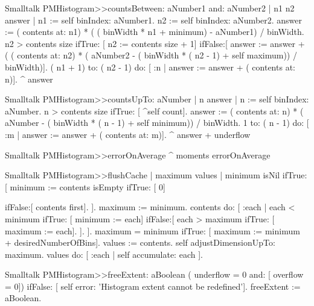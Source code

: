 \begin{displaycode}{Smalltalk}
PMHistogram>>countsBetween: aNumber1 and: aNumber2
    | n1 n2 answer |
    n1 := self binIndex: aNumber1.
    n2 := self binIndex: aNumber2.
    answer := ( contents at: n1) * ( ( binWidth * n1 + minimum) - 
                                                 aNumber1) / binWidth.
    n2 > contents size
        ifTrue: [ n2 := contents size + 1]
        ifFalse:[ answer := answer + ( ( contents at: n2) * ( 
      aNumber2 - ( binWidth * ( n2 - 1) + self maximum)) / binWidth)].
    ( n1 + 1) to: ( n2 - 1) do: [ :n | answer := answer + ( contents 
                                                              at: n)].
    ^ answer
\end{displaycode}
  
\begin{displaycode}{Smalltalk}
PMHistogram>>countsUpTo: aNumber
    | n answer |
    n := self binIndex: aNumber.
    n > contents size
        ifTrue: [ ^self count].
    answer := ( contents at: n) * ( aNumber - ( binWidth * ( n - 1) + 
                                            self minimum)) / binWidth.
    1 to: ( n - 1) do: [ :m | answer := answer + ( contents at: m)].
    ^ answer + underflow
\end{displaycode}
  
\begin{displaycode}{Smalltalk}
PMHistogram>>errorOnAverage
    ^ moments errorOnAverage
\end{displaycode}
  
\begin{displaycode}{Smalltalk}
PMHistogram>>flushCache
    | maximum values |
    minimum isNil
        ifTrue: [ minimum := contents isEmpty ifTrue: [ 0]
                                                                      
                                            ifFalse:[ contents first].
                   ].
    maximum := minimum.
    contents do:
        [ :each |
          each < minimum
            ifTrue: [ minimum := each]
            ifFalse:[ each > maximum
                            ifTrue: [ maximum := each].
                        ].
        ].
    maximum = minimum
        ifTrue: [ maximum := minimum + desiredNumberOfBins].
    values := contents.
    self adjustDimensionUpTo: maximum.
    values do: [ :each | self accumulate: each ].
\end{displaycode}
    
\begin{displaycode}{Smalltalk}
PMHistogram>>freeExtent: aBoolean
    ( underflow = 0 and: [ overflow = 0])
        ifFalse: [ self error: 'Histogram extent cannot be 
                                                          redefined'].
    freeExtent := aBoolean.
\end{displaycode}
  
